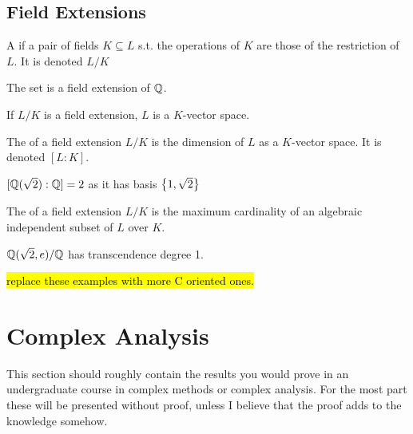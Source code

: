 \documentclass{article}
\begin{document}
\subsection{Field Extensions}
\begin{definition}
	A  if a pair of fields $K \subseteq L$ s.t. the operations of $K$ are those of the restriction of $L$. It is denoted $L / K$
\end{definition}

\begin{example}
	The set 
	is a field extension of $\mathbb{Q}$. 
\end{example}

\begin{prop}
	If $L/K$ is a field extension, $L$ is a $K$-vector space. 
\end{prop}

\begin{definition}
	The  of a field extension $L/K$ is the dimension of $L$ as a $K$-vector space. It is denoted $[L:K]$.
\end{definition}

\begin{example}
	$[\mathbb{Q}(\sqrt{2}):\mathbb{Q}] = 2$ as it has basis $\left\{ 1,\sqrt{2} \right\}$
\end{example}

\begin{definition}
	The  of a field extension $L/K$ is the maximum cardinality of an algebraic independent subset of $L$ over $K$. 
\end{definition}

\begin{example}
	$\mathbb{Q}(\sqrt{2},e)/\mathbb{Q}$ has transcendence degree 1.
\end{example}

\hl{replace these examples with more C oriented ones. }
\section{Complex Analysis}
This section should roughly contain the results you would prove in an undergraduate course in complex methods or complex analysis. For the most part these will be presented without proof, unless I believe that the proof adds to the knowledge somehow. 
\end{document}
